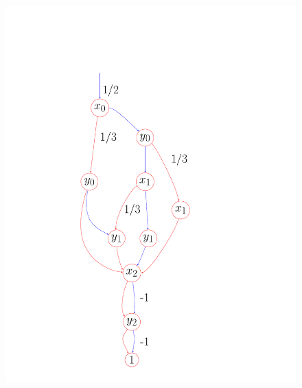 \documentclass[aspectratio=1610,18pt]{ctexbeamer}
\begin{document}
\begin{frame}
\begin{figure}[tbh]
      \begin{minipage}{0.5\textwidth}  \includegraphics[width=\textwidth]{Projector.pdf}
      \end{minipage}
    \end{figure}
\end{frame}
\end{document}
